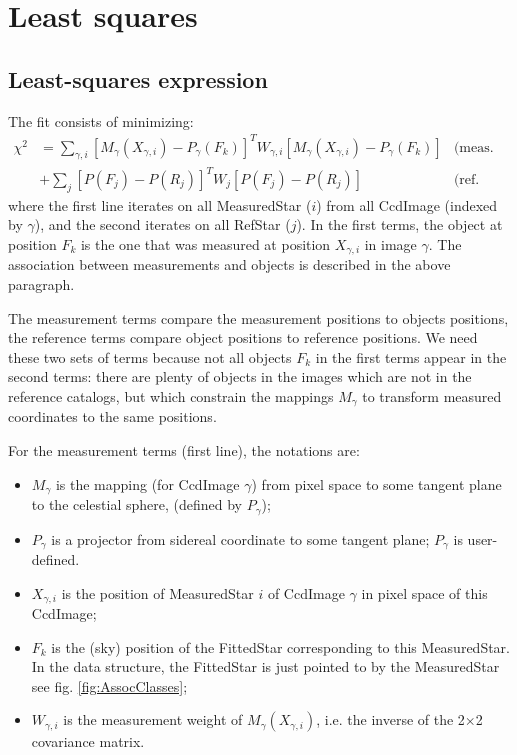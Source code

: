 \documentclass[a4paper,12pt]{scrartcl}
\begin{document}
\section{Least squares \label{sec:ls}}
\subsection{Least-squares expression}
The fit consists of minimizing:
\begin{align}
\chi^2 & =  \sum_{\gamma,i}  [M_\gamma(X_{\gamma,i})-P_{\gamma}(F_k) ]^T W_{\gamma,i}  [M_\gamma(X_{\gamma,i})-P_{\gamma}(F_k) ] & \textrm{(meas. terms)} \nonumber \\
         &+\sum_j [P(F_j)-P(R_j)]^T W_j [P(F_j)-P(R_j)] & \textrm{(ref. terms)} \label{eq:chi2}
\end{align}
where the first line iterates on all MeasuredStar ($i$) from all
CcdImage (indexed by $\gamma$), and the second iterates on all RefStar
($j$). In the first terms, the object at position $F_k$ is the one
that was measured at position $X_{\gamma,i}$ in image $\gamma$. 
The association between measurements and objects is 
described in the above paragraph. 

    The measurement terms compare the measurement positions
to objects positions, the reference terms compare object positions 
to reference positions. We need these two sets of terms
because not all objects $F_k$ in the first terms appear
in the second terms: there are plenty of objects in the images
which are not in the reference catalogs, but which constrain the
mappings $M_\gamma$ to transform measured coordinates to the
same positions. 

For the measurement terms (first line), the notations are:
\begin{itemize}
\item $M_\gamma$ is the mapping (for CcdImage $\gamma$) from pixel space to
some tangent plane to the celestial sphere, (defined by $P_\gamma$);
\item $P_\gamma$ is a projector from sidereal coordinate to some tangent plane;
$P_\gamma$ is user-defined.
\item $X_{\gamma,i}$ is the position of MeasuredStar $i$ of CcdImage $\gamma$
in pixel space of this CcdImage;
\item $F_k$ is the (sky) position of the FittedStar corresponding 
to this MeasuredStar. In the data structure, the FittedStar is just pointed to 
by the MeasuredStar see fig. \ref{fig:AssocClasses};
\item $W_{\gamma,i}$ is the measurement weight of $M_\gamma(X_{\gamma,i})$, i.e.
the inverse of the 2$\times$2 covariance matrix.
\end{itemize}
\end{document}
